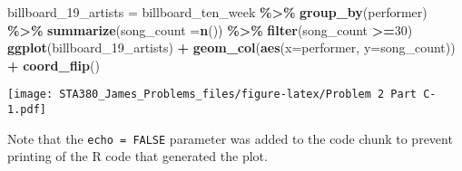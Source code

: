 \documentclass[
]{article}
\newenvironment{Shaded}{\begin{snugshade}}{\end{snugshade}}
\newcommand{\AttributeTok}[1]{\textcolor[rgb]{0.13,0.29,0.53}{#1}}
\newcommand{\DecValTok}[1]{\textcolor[rgb]{0.00,0.00,0.81}{#1}}
\newcommand{\FunctionTok}[1]{\textcolor[rgb]{0.13,0.29,0.53}{\textbf{#1}}}
\newcommand{\NormalTok}[1]{#1}
\newcommand{\OtherTok}[1]{\textcolor[rgb]{0.56,0.35,0.01}{#1}}
\newcommand{\SpecialCharTok}[1]{\textcolor[rgb]{0.81,0.36,0.00}{\textbf{#1}}}
\begin{document}
\begin{Shaded}
\begin{Highlighting}[]
\NormalTok{billboard\_19\_artists }\OtherTok{=}\NormalTok{ billboard\_ten\_week }\SpecialCharTok{\%\textgreater{}\%} \FunctionTok{group\_by}\NormalTok{(performer) }\SpecialCharTok{\%\textgreater{}\%} 
  \FunctionTok{summarize}\NormalTok{(}\AttributeTok{song\_count =}\FunctionTok{n}\NormalTok{()) }\SpecialCharTok{\%\textgreater{}\%} \FunctionTok{filter}\NormalTok{(song\_count }\SpecialCharTok{\textgreater{}=}\DecValTok{30}\NormalTok{)}
\FunctionTok{ggplot}\NormalTok{(billboard\_19\_artists) }\SpecialCharTok{+} \FunctionTok{geom\_col}\NormalTok{(}\FunctionTok{aes}\NormalTok{(}\AttributeTok{x=}\NormalTok{performer, }\AttributeTok{y=}\NormalTok{song\_count)) }\SpecialCharTok{+} 
  \FunctionTok{coord\_flip}\NormalTok{()}
\end{Highlighting}
\end{Shaded}

\texttt{[image: STA380\_James\_Problems\_files/figure-latex/Problem 2 Part C-1.pdf]}

Note that the \texttt{echo\ =\ FALSE} parameter was added to the code
chunk to prevent printing of the R code that generated the plot.
\end{document}
